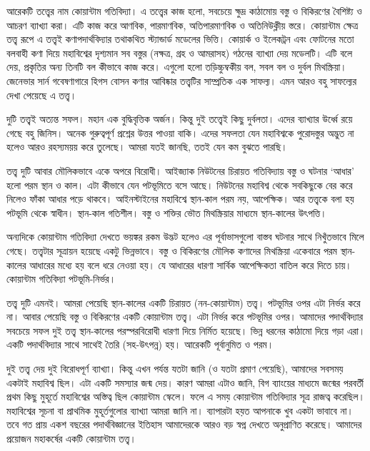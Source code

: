 \documentclass[
  letterpaper,
  DIV=11,
  numbers=noendperiod]{scrreprt}
\begin{document}
আরেকটি তত্ত্বের নাম কোয়ান্টাম গতিবিদ্যা। এ তত্ত্বের কাজ হলো, সবচেয়ে ক্ষুদ্র
কাঠামোয় বস্তু ও বিকিরণের বৈশিষ্ট্য ও আচরণ ব্যাখ্যা করা। এটি কাজ করে আণবিক,
পারমাণবিক, অতিপারমাণবিক ও অতিনিউক্লীয় স্তরে। কোয়ান্টাম ক্ষেত্র তত্ত্ব রূপে এ
তত্ত্বই কণাপদার্থবিদ্যার তথাকথিত স্ট্যান্ডার্ড মডেলের ভিত্তি। কোয়ার্ক ও ইলেকট্রন
এবং ফোটনের মতো বলবাহী কণা দিয়ে মহাবিশ্বের দৃশ্যমান সব বস্তুর (নক্ষত্র, গ্রহ ও
আমরাসহ) গঠনের ব্যাখ্যা দেয় মডেলটি। এটি বলে দেয়, প্রকৃতির অন্য তিনটি বল কীভাবে
কাজ করে। এগুলো হলো তড়িচ্চুম্বকীয় বল, সবল বল ও দুর্বল মিথস্ক্রিয়া। জেনেভার সার্ন
গবেষণাগারে হিগস বোসন কণার আবিষ্কার তত্ত্বটির সাম্প্রতিক এক সাফল্য। এমন আরও বহু
সাফল্যের দেখা পেয়েছে এ তত্ত্ব।

দুটি তত্ত্বই অত্যন্ত সফল। মহান এক বুদ্ধিবৃত্তিক অর্জন। কিন্তু দুই তত্ত্বেই কিছু দুর্বলতা।
এদের ব্যাখ্যার উর্ধ্বে রয়ে গেছে বহু জিনিস। অনেক গুরুত্বপূর্ণ প্রশ্নের উত্তর পাওয়া
বাকি। এদের সফলতা যেন মহাবিশ্বকে পুরোদস্তুর অদ্ভুত না হলেও আরও রহস্যময়য় করে
তুলেছে। আমরা যতই জানছি, ততই যেন কম বুঝতে পারছি।

তত্ত্ব দুটি আবার মৌলিকভাবে একে অপরে বিরোধী। আইজ্যাক নিউটনের চিরায়ত গতিবিদ্যায়
বস্তু ও ঘটনার `আধার' হলো পরম স্থান ও কাল। এটা কীভাবে যেন পটভূমিতে বসে আছে।
নিউটনের মহাবিশ্ব থেকে সবকিছুকে বের করে নিলেও ফাঁকা আধার পড়ে থাকবে।
আইনস্টাইনের মহাবিশ্বে স্থান-কাল পরম নয়, আপেক্ষিক। আর তত্ত্বকে বলা হয় পটভূমি
থেকে স্বাধীন। স্থান-কাল গতিশীল। বস্তু ও শক্তির ভৌত মিথস্ক্রিয়ার মাধ্যমে
স্থান-কালের উৎপত্তি।

অন্যদিকে কোয়ান্টাম গতিবিদ্যা দেখতে ভয়ঙ্কর রকম উদ্ভট হলেও এর পূর্বাভাসগুলো বাস্তব
ঘটনার সাথে নিখুঁতভাবে মিলে গেছে। তত্ত্বটার সূত্রায়ন হয়েছে একটু ভিন্নভাবে। বস্তু ও
বিকিরণের মৌলিক কণাদের মিথস্ক্রিয়া একেবারে পরম স্থান-কালের আধারের মধ্যে হয়
বলে ধরে নেওয়া হয়। যে আধারের ধারণা সার্বিক আপেক্ষিকতা বাতিল করে দিতে চায়।
কোয়ান্টাম গতিবিদ্যা পটভূমি-নির্ভর।

তত্ত্ব দুটি এমনই। আমরা পেয়েছি স্থান-কালের একটি চিরায়ত (নন-কোয়ান্টাম) তত্ত্ব।
পটভূমির ওপর এটা নির্ভর করে না। আবার পেয়েছি বস্তু ও বিকিরণের একটি কোয়ান্টাম
তত্ত্ব। এটা নির্ভর করে পটভূমির ওপর। আমাদের পদার্থবিদ্যার সবচেয়ে সফল দুই তত্ত্ব
স্থান-কালের পরস্পরবিরোধী ধারণা দিয়ে নির্মিত হয়েছে। ভিন্ন ধরনের কাঠামো দিয়ে
গড়া এরা। একটি পদার্থবিদ্যার সাথে সাথেই তৈরি (সহ-উৎপন্ন) হয়। আরেকটি পূর্বানুমিত
ও পরম।

দুই তত্ত্ব দেয় দুই বিরোধপূর্ণ ব্যাখ্যা। কিন্তু এখন পর্যন্ত যতটা জানি (ও যতটা প্রমাণ
পেয়েছি), আমাদের সবসময় একটাই মহাবিশ্ব ছিল। এটা একটি সমস্যার জন্ম দেয়। কারণ
আমরা এটাও জানি, বিগ ব্যাংয়ের মাধ্যমে জন্মের পরবর্তী প্রথম কিছু মুহূর্তে মহাবিশ্বের
অস্তিত্ব ছিল কোয়ান্টাম স্কেলে। ফলে এ সময় কোয়ান্টাম গতিবিদ্যার সূত্র রাজত্ব
করেছিল। মহাবিশ্বের সূচনা বা প্রাথমিক মুহূর্তগুলোর ব্যাখ্যা আমরা জানি না। ব্যাপারটা
হয়ত আপনাকে খুব একটা ভাবাবে না। তবে গত প্রায় একশ বছরের পদার্থবিজ্ঞানের ইতিহাস
আমাদেরকে আরও বড় স্বপ্ন দেখতে অনুপ্রাণিত করেছে। আমাদের প্রয়োজন মহাকর্ষের একটি
কোয়ান্টাম তত্ত্ব।
\end{document}
